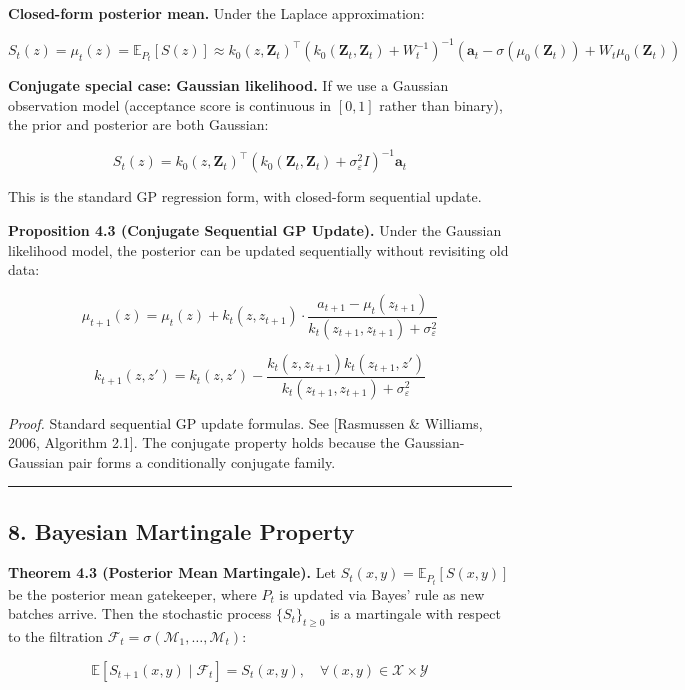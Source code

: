 \documentclass[
  12pt,
]{article}
\begin{document}
\textbf{Closed-form posterior mean.} Under the Laplace approximation:

\[
S_t(z) = \mu_t(z) = \mathbb{E}_{P_t}[S(z)] \approx k_0(z, \mathbf{Z}_t)^\top (k_0(\mathbf{Z}_t, \mathbf{Z}_t) + W_t^{-1})^{-1} (\mathbf{a}_t - \sigma(\mu_0(\mathbf{Z}_t)) + W_t \mu_0(\mathbf{Z}_t))
\]

\textbf{Conjugate special case: Gaussian likelihood.} If we use a
Gaussian observation model (acceptance score is continuous in \([0,1]\)
rather than binary), the prior and posterior are both Gaussian:

\[
S_t(z) = k_0(z, \mathbf{Z}_t)^\top (k_0(\mathbf{Z}_t, \mathbf{Z}_t) + \sigma^2_\varepsilon I)^{-1} \mathbf{a}_t
\]

This is the standard GP regression form, with closed-form sequential
update.

\textbf{Proposition 4.3 (Conjugate Sequential GP Update).} Under the
Gaussian likelihood model, the posterior can be updated sequentially
without revisiting old data:

\[
\mu_{t+1}(z) = \mu_t(z) + k_t(z, z_{t+1}) \cdot \frac{a_{t+1} - \mu_t(z_{t+1})}{k_t(z_{t+1}, z_{t+1}) + \sigma^2_\varepsilon}
\]

\[
k_{t+1}(z, z') = k_t(z, z') - \frac{k_t(z, z_{t+1}) k_t(z_{t+1}, z')}{k_t(z_{t+1}, z_{t+1}) + \sigma^2_\varepsilon}
\]

\emph{Proof.} Standard sequential GP update formulas. See {[}Rasmussen
\& Williams, 2006, Algorithm 2.1{]}. The conjugate property holds
because the Gaussian-Gaussian pair forms a conditionally conjugate
family.

\begin{center}\rule{0.5\linewidth}{0.5pt}\end{center}

\subsection{8. Bayesian Martingale
Property}\label{bayesian-martingale-property}

\textbf{Theorem 4.3 (Posterior Mean Martingale).} Let
\(S_t(x,y) = \mathbb{E}_{P_t}[S(x,y)]\) be the posterior mean
gatekeeper, where \(P_t\) is updated via Bayes' rule as new batches
arrive. Then the stochastic process \(\{S_t\}_{t \geq 0}\) is a
martingale with respect to the filtration
\(\mathcal{F}_t = \sigma(\mathcal{M}_1, \dots, \mathcal{M}_t)\):

\[
\mathbb{E}[S_{t+1}(x,y) \mid \mathcal{F}_t] = S_t(x,y), \quad \forall (x,y) \in \mathcal{X} \times \mathcal{Y}
\]
\end{document}
